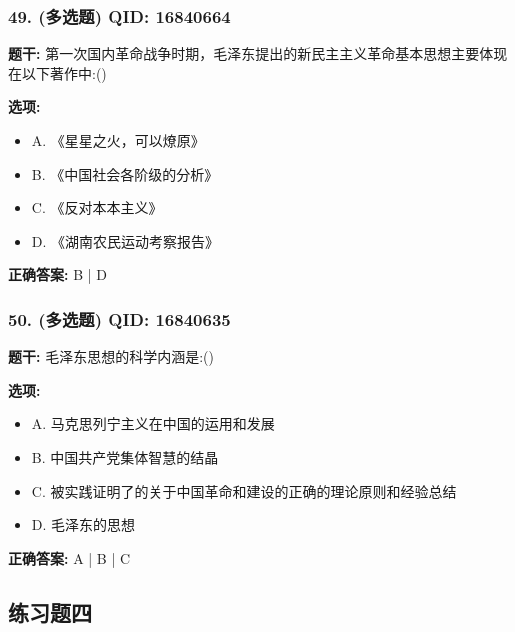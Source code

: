 \documentclass[12pt,UTF8]{ctexart}
\begin{document}
\subsubsection*{49. (多选题) \small QID: 16840664}

\textbf{题干:}
第一次国内革命战争时期，毛泽东提出的新民主主义革命基本思想主要体现在以下著作中:()

\textbf{选项:}
\begin{itemize}[leftmargin=*]

  \item A. 《星星之火，可以燎原》

  \item B. 《中国社会各阶级的分析》

  \item C. 《反对本本主义》

  \item D. 《湖南农民运动考察报告》

\end{itemize}

\textbf{正确答案:}
B | D

\vspace{0.3em}\hrulefill\vspace{0.7em}

\subsubsection*{50. (多选题) \small QID: 16840635}

\textbf{题干:}
毛泽东思想的科学内涵是:()

\textbf{选项:}
\begin{itemize}[leftmargin=*]

  \item A. 马克思列宁主义在中国的运用和发展

  \item B. 中国共产党集体智慧的结晶

  \item C. 被实践证明了的关于中国革命和建设的正确的理论原则和经验总结

  \item D. 毛泽东的思想

\end{itemize}

\textbf{正确答案:}
A | B | C

\vspace{0.3em}\hrulefill\vspace{0.7em}

\subsection*{练习题四}
\end{document}
